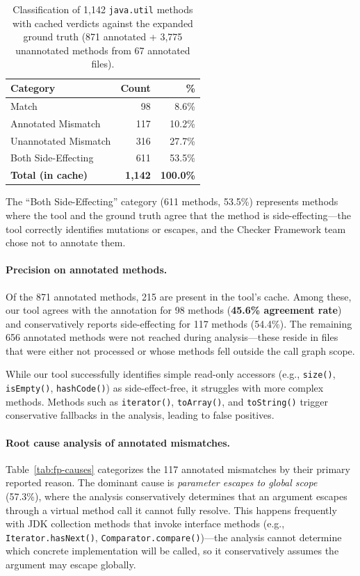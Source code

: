 \begin{table}[h]
\centering
\caption{Classification of 1,142 \texttt{java.util} methods with cached verdicts against the expanded ground truth (871 annotated + 3,775 unannotated methods from 67 annotated files).}
\label{tab:results}
\begin{tabular}{lrr}
\toprule
\textbf{Category} & \textbf{Count} & \textbf{\%} \\
\midrule
Match                 &    98 &  8.6\% \\
Annotated Mismatch    &   117 & 10.2\% \\
Unannotated Mismatch  &   316 & 27.7\% \\
Both Side-Effecting   &   611 & 53.5\% \\
\midrule
\textbf{Total (in cache)} & \textbf{1,142} & \textbf{100.0\%} \\
\bottomrule
\end{tabular}
\end{table}

The ``Both Side-Effecting'' category (611 methods, 53.5\%) represents methods where the tool and the ground truth agree that the method is side-effecting---the tool correctly identifies mutations or escapes, and the Checker Framework team chose not to annotate them.

\paragraph{Precision on annotated methods.}
Of the 871 annotated methods, 215 are present in the tool's cache.
Among these, our tool agrees with the annotation for 98 methods (\textbf{45.6\% agreement rate}) and conservatively reports side-effecting for 117 methods (54.4\%).
The remaining 656 annotated methods were not reached during analysis---these reside in files that were either not processed or whose methods fell outside the call graph scope.

While our tool successfully identifies simple read-only accessors (e.g., \texttt{size()}, \texttt{isEmpty()}, \texttt{hashCode()}) as side-effect-free, it struggles with more complex methods.
Methods such as \texttt{iterator()}, \texttt{toArray()}, and \texttt{toString()} trigger conservative fallbacks in the analysis, leading to false positives.

\paragraph{Root cause analysis of annotated mismatches.}
Table~\ref{tab:fp-causes} categorizes the 117 annotated mismatches by their primary reported reason.
The dominant cause is \emph{parameter escapes to global scope} (57.3\%), where the analysis conservatively determines that an argument escapes through a virtual method call it cannot fully resolve.
This happens frequently with JDK collection methods that invoke interface methods (e.g., \texttt{Iterator.hasNext()}, \texttt{Comparator.compare()})---the analysis cannot determine which concrete implementation will be called, so it conservatively assumes the argument may escape globally.


